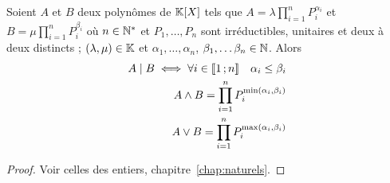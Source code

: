 \begin{cor}
  Soient $A$ et $B$ deux polynômes de $\mathbb{K}[X]$ tels que $A=\lambda \prod_{i=1}^n P_i^{\alpha_i}$ et $B=\mu \prod_{i=1}^n P_i^{\beta_i}$ où $n \in \mathbb{N}^*$ et $P_1, \ldots, P_n$ sont irréductibles, unitaires et deux à deux distincts ; $(\lambda, \mu)\in\mathbb{K}$ et $\alpha_1, \ldots, \alpha_n$, $\beta_1,\ldots \beta_n \in \mathbb{N}$. Alors
  \begin{align}
    A\mid{}B \iff \forall i \in \mathopen{\llbracket}1\mathclose{}\mathpunct{};n\mathclose{\rrbracket} \quad \alpha_i \leq \beta_i \\
    A \wedge B = \prod_{i=1}^n P_i^{\min(\alpha_i,\beta_i)}\\
    A \vee B = \prod_{i=1}^n P_i^{\max(\alpha_i,\beta_i)}
  \end{align}
\end{cor}
\begin{proof}
  Voir celles des entiers, chapitre~\ref{chap:naturels}.
\end{proof}
